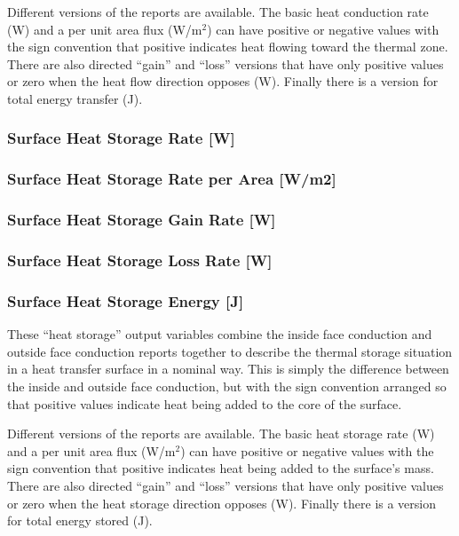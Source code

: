 Different versions of the reports are available. The basic heat conduction rate (W) and a per unit area flux (W/m\(^{2}\)) can have positive or negative values with the sign convention that positive indicates heat flowing toward the thermal zone. There are also directed ``gain'' and ``loss'' versions that have only positive values or zero when the heat flow direction opposes (W). Finally there is a version for total energy transfer (J).

\subsubsection{Surface Heat Storage Rate {[}W{]}}\label{surface-heat-storage-rate-w}

\subsubsection{Surface Heat Storage Rate per Area {[}W/m2{]}}\label{surface-heat-storage-rate-per-area-wm2}

\subsubsection{Surface Heat Storage Gain Rate {[}W{]}}\label{surface-heat-storage-gain-rate-w}

\subsubsection{Surface Heat Storage Loss Rate {[}W{]}}\label{surface-heat-storage-loss-rate-w}

\subsubsection{Surface Heat Storage Energy {[}J{]}}\label{surface-heat-storage-energy-j}

These ``heat storage'' output variables combine the inside face conduction and outside face conduction reports together to describe the thermal storage situation in a heat transfer surface in a nominal way. This is simply the difference between the inside and outside face conduction, but with the sign convention arranged so that positive values indicate heat being added to the core of the surface.

Different versions of the reports are available. The basic heat storage rate (W) and a per unit area flux (W/m\(^{2}\)) can have positive or negative values with the sign convention that positive indicates heat being added to the surface's mass. There are also directed ``gain'' and ``loss'' versions that have only positive values or zero when the heat storage direction opposes (W). Finally there is a version for total energy stored (J).

